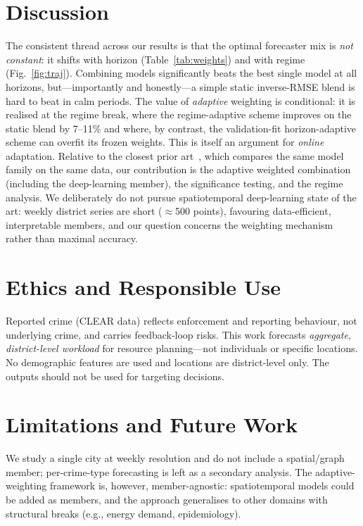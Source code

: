 \documentclass[11pt]{article}
\begin{document}
\section{Discussion}\label{sec:disc}
The consistent thread across our results is that the optimal forecaster mix is \emph{not constant}: it
shifts with horizon (Table~\ref{tab:weights}) and with regime (Fig.~\ref{fig:traj}). Combining models
significantly beats the best single model at all horizons, but---importantly and honestly---a simple
static inverse-RMSE blend is hard to beat in calm periods. The value of \emph{adaptive} weighting is
conditional: it is realised at the regime break, where the regime-adaptive scheme improves on the
static blend by 7--11\% and where, by contrast, the validation-fit horizon-adaptive scheme can overfit
its frozen weights. This is itself an argument for \emph{online} adaptation. Relative to the closest
prior art~\cite{ncaa2025}, which compares the same model family on the same data, our contribution is
the adaptive weighted combination (including the deep-learning member), the significance testing, and
the regime analysis. We deliberately do not pursue spatiotemporal deep-learning state of the art:
weekly district series are short ($\approx$500 points), favouring data-efficient, interpretable members,
and our question concerns the weighting mechanism rather than maximal accuracy.

\section{Ethics and Responsible Use}
Reported crime (CLEAR data) reflects enforcement and reporting behaviour, not underlying crime, and
carries feedback-loop risks. This work forecasts \emph{aggregate, district-level workload} for resource
planning---not individuals or specific locations. No demographic features are used and locations are
district-level only. The outputs should not be used for targeting decisions.

\section{Limitations and Future Work}
We study a single city at weekly resolution and do not include a spatial/graph member; per-crime-type
forecasting is left as a secondary analysis. The adaptive-weighting framework is, however,
member-agnostic: spatiotemporal models could be added as members, and the approach generalises to other
domains with structural breaks (e.g., energy demand, epidemiology).
\end{document}
